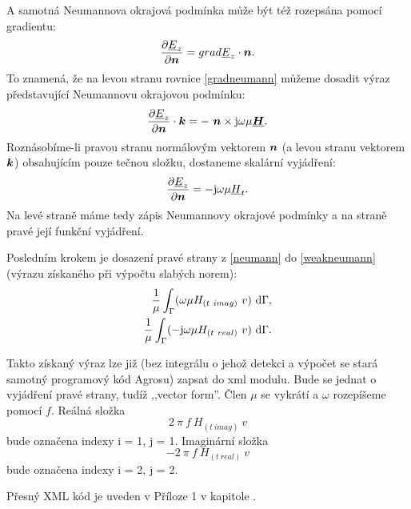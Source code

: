 \documentclass[12pt,a4paper,oneside]{article}
\numberwithin{equation}{section} %
\numberwithin{figure}{section} %
\numberwithin{table}{section} %
\newcommand{\mj}{\mathrm{j}} %
\renewcommand{\vec}[1]{\mbox{\boldmath$#1$}} %
\newcommand{\faz}[1]{{\underline{#1}}} %
\begin{document}
A samotná Neumannova okrajová podmínka může být též rozepsána pomocí gradientu:
\begin{equation}
\label{gradneumann}
\frac{\partial \faz{E}_z}{\partial \vec{n}} = grad \faz{E}_z \cdot \vec{n} .
\end{equation}
To znamená, že na levou stranu rovnice \ref{gradneumann} můžeme dosadit výraz představující Neumannovu okrajovou podmínku:
\begin{equation}
\frac{\partial \faz{E}_z}{\partial \vec{n}} \cdot \vec{k} = - ~ \vec{n} \times \mj \omega \mu \faz{\vec{H}}.
\end{equation}
Roznásobíme-li pravou stranu normálovým vektorem $\vec{n}$ (a levou stranu vektorem $\vec{k}$) obsahujícím pouze tečnou složku, dostaneme skalární vyjádření:
\begin{equation}
\label{neumann}
\frac{\partial \faz{E}_z}{\partial \vec{n}} = - \mj \omega \mu \faz{H}_t .
\end{equation}
Na levé straně máme tedy zápis Neumannovy okrajové podmínky a na straně pravé její funkční vyjádření.

Posledním krokem je dosazení pravé strany z \ref{neumann} do \ref{weakneumann} (výrazu získaného při výpočtu slabých norem):
\begin{subequations}
\begin{align}
\frac{1}{\mu} \int _{\Gamma} ( \omega \mu H_{(t~imag)} ~ v ) ~ \ud \Gamma ,
\\ 
\frac{1}{\mu} \int _{\Gamma} ( - \mj \omega \mu H_{(t~real)} ~ v ) ~ \ud \Gamma .
\end{align}
\end{subequations}

Takto získaný výraz lze již (bez integrálu o jehož detekci a výpočet se stará samotný programový kód Agrosu) zapsat do xml modulu. Bude se jednat o vyjádření pravé strany, tudíž ,,vector form''. Člen $\mu$ se vykrátí a $\omega$ rozepíšeme pomocí $f$. Reálná složka 
\begin{equation}
2 ~ \pi ~ f ~ H_{(t~imag)} ~ v
\end{equation} 
bude označena indexy i = 1, j = 1. Imaginární složka 
\begin{equation}
- 2 ~ \pi ~ f ~ H_{(t~real)} ~ v
\end{equation}
bude označena indexy i = 2, j = 2.

Přesný XML kód je uveden v Příloze 1 v kapitole .
\end{document}

